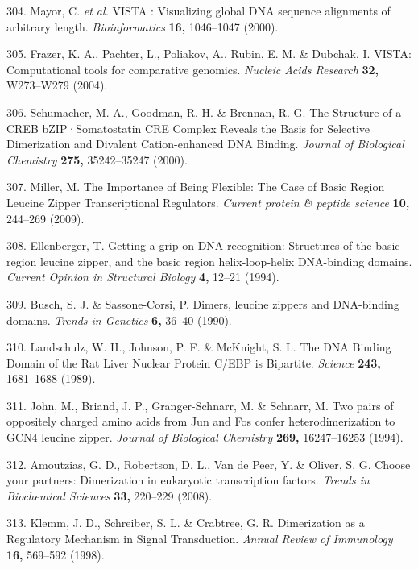 \documentclass[12pt,]{book}
\begin{document}
\hypertarget{ref-mayor_vista_2000}{}
304. Mayor, C. \emph{et al.} VISTA : Visualizing global DNA sequence
alignments of arbitrary length. \emph{Bioinformatics} \textbf{16,}
1046--1047 (2000).

\hypertarget{ref-frazer_vista_2004}{}
305. Frazer, K. A., Pachter, L., Poliakov, A., Rubin, E. M. \& Dubchak,
I. VISTA: Computational tools for comparative genomics. \emph{Nucleic
Acids Research} \textbf{32,} W273--W279 (2004).

\hypertarget{ref-schumacher_structure_2000}{}
306. Schumacher, M. A., Goodman, R. H. \& Brennan, R. G. The Structure
of a CREB bZIP·Somatostatin CRE Complex Reveals the Basis for Selective
Dimerization and Divalent Cation-enhanced DNA Binding. \emph{Journal of
Biological Chemistry} \textbf{275,} 35242--35247 (2000).

\hypertarget{ref-miller_importance_2009}{}
307. Miller, M. The Importance of Being Flexible: The Case of Basic
Region Leucine Zipper Transcriptional Regulators. \emph{Current protein
\& peptide science} \textbf{10,} 244--269 (2009).

\hypertarget{ref-ellenberger_getting_1994}{}
308. Ellenberger, T. Getting a grip on DNA recognition: Structures of
the basic region leucine zipper, and the basic region helix-loop-helix
DNA-binding domains. \emph{Current Opinion in Structural Biology}
\textbf{4,} 12--21 (1994).

\hypertarget{ref-busch_dimers_1990}{}
309. Busch, S. J. \& Sassone-Corsi, P. Dimers, leucine zippers and
DNA-binding domains. \emph{Trends in Genetics} \textbf{6,} 36--40
(1990).

\hypertarget{ref-landschulz_dna_1989}{}
310. Landschulz, W. H., Johnson, P. F. \& McKnight, S. L. The DNA
Binding Domain of the Rat Liver Nuclear Protein C/EBP is Bipartite.
\emph{Science} \textbf{243,} 1681--1688 (1989).

\hypertarget{ref-john_two_1994}{}
311. John, M., Briand, J. P., Granger-Schnarr, M. \& Schnarr, M. Two
pairs of oppositely charged amino acids from Jun and Fos confer
heterodimerization to GCN4 leucine zipper. \emph{Journal of Biological
Chemistry} \textbf{269,} 16247--16253 (1994).

\hypertarget{ref-amoutzias_choose_2008}{}
312. Amoutzias, G. D., Robertson, D. L., Van de Peer, Y. \& Oliver, S.
G. Choose your partners: Dimerization in eukaryotic transcription
factors. \emph{Trends in Biochemical Sciences} \textbf{33,} 220--229
(2008).

\hypertarget{ref-klemm_dimerization_1998}{}
313. Klemm, J. D., Schreiber, S. L. \& Crabtree, G. R. Dimerization as a
Regulatory Mechanism in Signal Transduction. \emph{Annual Review of
Immunology} \textbf{16,} 569--592 (1998).
\end{document}
